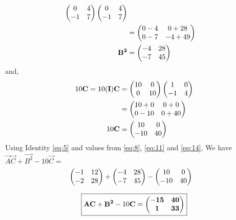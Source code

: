 \documentclass[journal,12pt,twocolumn]{IEEEtran}
\renewcommand\thesection{\arabic{section}}
\begin{document}
\begin{enumerate}[label=\thesection.\arabic*.,ref=\thesection.\theenumi]
\begin{align}
          \begin{pmatrix} 
              0 & 4 \\
              -1 & 7
          \end{pmatrix} 
          \begin{pmatrix} 
              0 & 4 \\
              -1 & 7
          \end{pmatrix}
          \\
          &=\begin{pmatrix} 
              0-4 & 0+28 \\
              0-7 & -4+49
          \end{pmatrix} 
          \\
          \mathbf{B^2}&=
          \begin{pmatrix} 
              -4 & 28 \\
              -7 & 45 
          \end{pmatrix}\label{eq:11}
    \end{align}
    and,
    \begin{align}
        10\mathbf{C}=10(\mathbf{I})\mathbf{C} &=
        \begin{pmatrix} 
            10 & 0 \\
            0 & 10
        \end{pmatrix} 
        \begin{pmatrix} 
            1 & 0 \\
            -1 & 4
        \end{pmatrix}
        \\
        &=\begin{pmatrix} 
            10+0 & 0+0 \\
            0-10 & 0+40
        \end{pmatrix}
        \\
        10\mathbf{C}&=
        \begin{pmatrix} 
            10 & 0 \\
            -10 & 40
        \end{pmatrix}\label{eq:14}
    \end{align}
    Using Identity \eqref{eq:5} and values from \eqref{eq:8}, \eqref{eq:11} and \eqref{eq:14}, We have\\
    $\vec{A}\vec{C}+\vec{B^2}-10\vec{C}=$
    \begin{align}
        & 
      \begin{pmatrix} 
          -1 & 12 \\
          -2 & 28
        \end{pmatrix} 
        +
      \begin{pmatrix} 
          -4 & 28 \\
          -7 & 45
        \end{pmatrix} 
        -
      \begin{pmatrix} 
          10 & 0 \\
          -10 & 40
      \end{pmatrix}
    \end{align}
    
    \begin{equation}
      \boxed{\mathbf{A}\mathbf{C}+\mathbf{B^2}-10\mathbf{C}=
       \begin{pmatrix} 
          \mathbf{-15} & \mathbf{40} \\
          \mathbf{1} & \mathbf{33}
        \end{pmatrix} 
      } 
    \end{equation}
  \end{enumerate}
\end{document}
